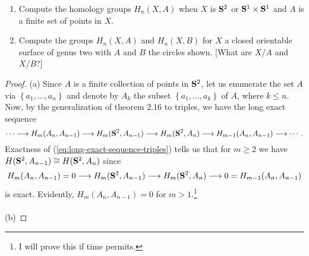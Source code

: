 \begin{problem}[Hatcher {\S}2.1, Ex.\,17]
\begin{enumerate}[label=(\alph*)]
\item Compute the homology groups $H_n(X,A)$ when $X$ is $\mathbf{S}^2$ or
  $\mathbf{S}^1\times\mathbf{S}^1$ and $A$ is a finite set of points in $X$.
\item Compute the groups $H_n(X,A)$ and $H_n(X,B)$ for $X$ a closed
  orientable surface of genus two with $A$ and $B$ the circles shown. [What
  are $X/A$ and $X/B$?]
\end{enumerate}
\end{problem}
\begin{proof}
(a) Since $A$ is a finite collection of points in $\mathbf{S}^2$, let us enumerate
the set $A$ via $\left\{ a_1,...,a_n \right\}$ and denote by $A_k$ the
subset $\left\{a_1,...,a_k\right\}$ of $A$, where $k\leq n$. Now, by the
generalization of theorem 2.16 to triples, we have the long exact sequence
\begin{equation}
\label{eq:long-exact-sequence-triples}
\cdots\longrightarrow H_m(A_n,A_{n-1})\longrightarrow
H_m(\mathbf{S}^2,A_{n-1})\longrightarrow H_m(\mathbf{S}^2,A_n)
\longrightarrow H_{m-1}(A_n,A_{n-1})\longrightarrow\cdots.
\end{equation}
Exactness of (\ref{eq:long-exact-sequence-triples}) tells us that for
$m\geq 2$ we have $H(\mathbf{S}^2,A_{n-1})\cong H(\mathbf{S}^2,A_n)$ since
\[
H_m(A_n,A_{n-1})=0\longrightarrow H_m(\mathbf{S}^2,A_{n-1})\longrightarrow
H_m(\mathbf{S}^2,A_n)\longrightarrow 0=H_{m-1}(A_n,A_{n-1})
\]
is exact. Evidently, $H_m(A_n,A_{n-1})=0$ for $m>1$.\footnote{I will prove
  this if time permits.}
\\\\
(b)
\end{proof}

